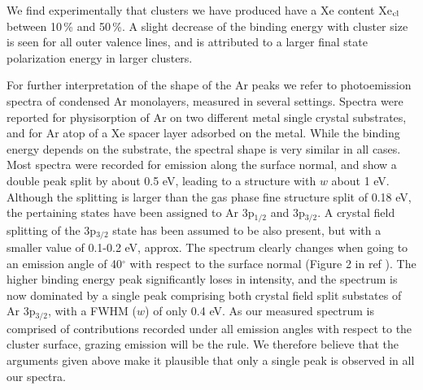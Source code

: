 We find experimentally that clusters we have produced have a Xe content Xe$_{\rm cl}$ between 10\,\% and 50\,\%.
A slight decrease of the binding energy with cluster size is seen for all outer valence lines, and is attributed to a larger final state polarization energy in larger clusters. 

For further interpretation of the shape of the Ar peaks we refer to photoemission spectra of condensed Ar monolayers, measured in several settings.\cite{jacobi,jacobi2}
Spectra were reported for physisorption of Ar on two different metal single crystal substrates, and for Ar atop of a Xe spacer layer adsorbed on the metal.
While the binding energy depends on the substrate, the spectral shape is very similar in all cases. 
Most spectra were recorded for emission along the surface normal, and show a double peak split by about 0.5 eV, leading to a structure with $w$ about 1 eV.
Although the splitting is larger than the gas phase fine structure split of 0.18 eV, the pertaining states have been assigned to Ar 3p$_{1/2}$ and 3p$_{3/2}$.
A crystal field splitting of the 3p$_{3/2}$ state has been assumed to be also present, but with a smaller value of 0.1-0.2 eV, approx.\cite{jacobi2} 
The spectrum clearly changes when going to an emission angle of 40$^\circ$ with respect to the surface normal (Figure 2 in ref ).
The higher binding energy peak significantly loses in intensity, and the spectrum is now dominated by a single peak comprising both crystal field split substates of Ar 3p$_{3/2}$, with a FWHM ($w$) of only 0.4 eV.
As our measured spectrum is comprised of contributions recorded under all emission angles with respect to the cluster surface, grazing emission will be the rule.
We therefore believe that the arguments given above make it plausible that only a single peak is observed in all our spectra.

